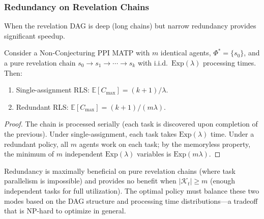 \subsubsection{Redundancy on Revelation Chains}

When the revelation DAG is deep (long chains) but narrow redundancy provides significant speedup.

\begin{proposition}\label{prop:or-benefit}
Consider a Non-Conjecturing PPI MATP with $m$ identical agents, $\Phi^* = \{s_0\}$, and a pure revelation chain $s_0\to s_1\to\cdots\to s_k$ with i.i.d.\ $\mathrm{Exp}(\lambda)$ processing times. Then:
\begin{enumerate}
    \item Single-assignment RLS: $\mathbb{E}[C_{\max}] = (k+1)/\lambda$.
    \item Redundant RLS: $\mathbb{E}[C_{\max}] = (k+1)/(m\lambda)$.
\end{enumerate}
\end{proposition}

\begin{proof}
The chain is processed serially (each task is discovered upon completion of the previous). Under single-assignment, each task takes $\mathrm{Exp}(\lambda)$ time. Under a redundant policy, all $m$ agents work on each task; by the memoryless property, the minimum of $m$ independent $\mathrm{Exp}(\lambda)$ variables is $\mathrm{Exp}(m\lambda)$.
\end{proof}

\begin{remark}
Redundancy is maximally beneficial on pure revelation chains (where task parallelism is impossible) and provides no benefit when $|\mathcal{K}_t| \ge m$ (enough independent tasks for full utilization). The optimal policy must balance these two modes based on the DAG structure and processing time distributions---a tradeoff that is NP-hard to optimize in general.
\end{remark}



